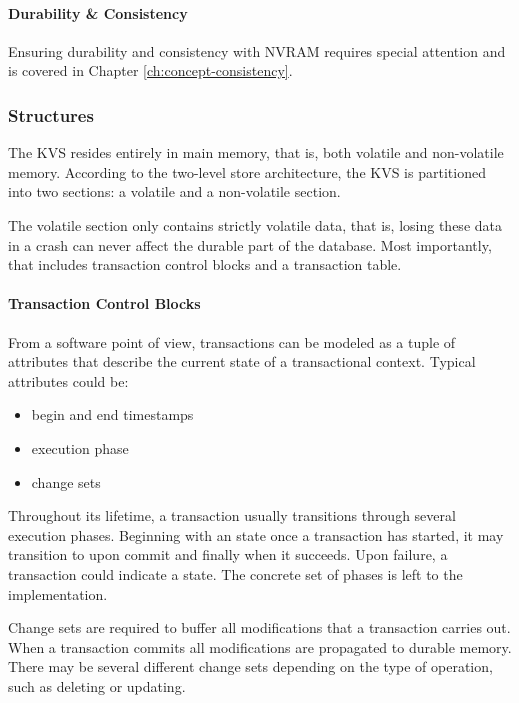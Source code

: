 \paragraph{Durability \& Consistency}

Ensuring durability and consistency with NVRAM requires special attention and is
covered in Chapter \ref{ch:concept-consistency}.

\subsubsection{Structures}

The KVS resides entirely in main memory, that is, both volatile and non-volatile
memory. According to the two-level store architecture, the KVS is partitioned
into two sections: a volatile and a non-volatile section.

The volatile section only contains strictly volatile data, that is, losing these
data in a crash can never affect the durable part of the database. Most
importantly, that includes transaction control blocks and a transaction table.

\paragraph{Transaction Control Blocks}

From a software point of view, transactions can be modeled as a tuple of
attributes that describe the current state of a transactional context. Typical
attributes could be:

\begin{itemize}
    \item begin and end timestamps
    \item execution phase
    \item change sets
\end{itemize}

Throughout its lifetime, a transaction usually transitions through several
execution phases. Beginning with an  state once a transaction has
started, it may transition to  upon commit and finally
 when it succeeds. Upon failure, a transaction could indicate a
 state. The concrete set of phases is left to the implementation.

Change sets are required to buffer all modifications that a transaction carries
out. When a transaction commits all modifications are propagated to durable
memory. There may be several different change sets depending on the type of
operation, such as deleting or updating.

